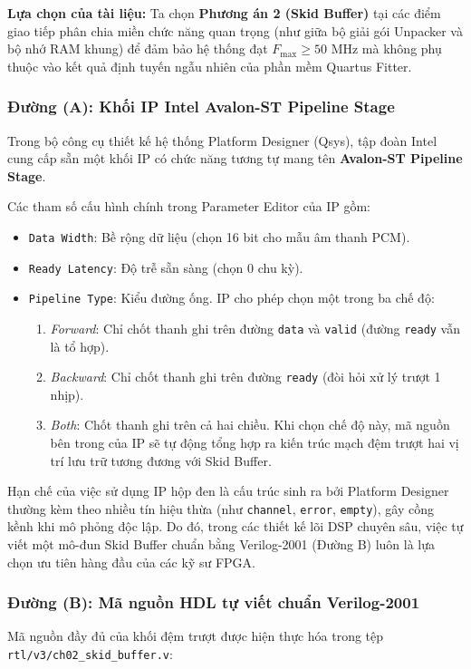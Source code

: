 \textbf{Lựa chọn của tài liệu:} Ta chọn \textbf{Phương án 2 (Skid Buffer)} tại các điểm giao tiếp phân chia miền chức năng quan trọng (như giữa bộ giải gói Unpacker và bộ nhớ RAM khung) để đảm bảo hệ thống đạt $F_{\max} \ge 50\text{ MHz}$ mà không phụ thuộc vào kết quả định tuyến ngẫu nhiên của phần mềm Quartus Fitter.

\subsubsection*{Đường (A): Khối IP Intel Avalon-ST Pipeline Stage}
Trong bộ công cụ thiết kế hệ thống Platform Designer (Qsys), tập đoàn Intel cung cấp sẵn một khối IP có chức năng tương tự mang tên \textbf{Avalon-ST Pipeline Stage}. 

Các tham số cấu hình chính trong Parameter Editor của IP gồm:
\begin{itemize}[leftmargin=1.5em, itemsep=2pt]
    \item \texttt{Data Width}: Bề rộng dữ liệu (chọn 16 bit cho mẫu âm thanh PCM).
    \item \texttt{Ready Latency}: Độ trễ sẵn sàng (chọn 0 chu kỳ).
    \item \texttt{Pipeline Type}: Kiểu đường ống. IP cho phép chọn một trong ba chế độ:
    \begin{enumerate}
        \item \emph{Forward}: Chỉ chốt thanh ghi trên đường \texttt{data} và \texttt{valid} (đường \texttt{ready} vẫn là tổ hợp).
        \item \emph{Backward}: Chỉ chốt thanh ghi trên đường \texttt{ready} (đòi hỏi xử lý trượt 1 nhịp).
        \item \emph{Both}: Chốt thanh ghi trên cả hai chiều. Khi chọn chế độ này, mã nguồn bên trong của IP sẽ tự động tổng hợp ra kiến trúc mạch đệm trượt hai vị trí lưu trữ tương đương với Skid Buffer.
    \end{enumerate}
\end{itemize}

Hạn chế của việc sử dụng IP hộp đen là cấu trúc sinh ra bởi Platform Designer thường kèm theo nhiều tín hiệu thừa (như \texttt{channel}, \texttt{error}, \texttt{empty}), gây cồng kềnh khi mô phỏng độc lập. Do đó, trong các thiết kế lõi DSP chuyên sâu, việc tự viết một mô-đun Skid Buffer chuẩn bằng Verilog-2001 (Đường B) luôn là lựa chọn ưu tiên hàng đầu của các kỹ sư FPGA.

\subsubsection*{Đường (B): Mã nguồn HDL tự viết chuẩn Verilog-2001}
Mã nguồn đầy đủ của khối đệm trượt được hiện thực hóa trong tệp \texttt{rtl/v3/ch02\_skid\_buffer.v}:

